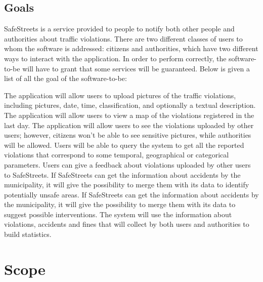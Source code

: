 \documentclass[../RASD.tex]{subfiles}
\begin{document}
    \subsection{Goals}\label{subsec:goals}
    SafeStreets is a service provided to people to notify both other people and authorities about traffic violations.
    There are two different classes of users to whom the software is addressed: citizens and authorities, which have two different ways to interact with the application.
    In order to perform correctly, the software-to-be will have to grant that some services will be guaranteed.
    Below is given a list of all the goal of the software-to-be:
    \begin{enumerate}
         The application will allow users to upload pictures of the traffic violations, including pictures, date, time, classification, and optionally a textual description.
         The application will allow users to view a map of the violations registered in the last day.
         The application will allow users to see the violations uploaded by other users;
        however, citizens won’t be able to see sensitive pictures, while authorities will be allowed.
         Users will be able to query the system to get all the reported violations that correspond to some temporal, geographical or categorical parameters.
         Users can give a feedback about violations uploaded by other users to SafeStreets.
         If SafeStreets can get the information about accidents by the municipality, it will give the possibility to merge them with its data to identify potentially unsafe areas.
        If SafeStreets can get the information about accidents by the municipality, it will give the possibility to merge them with its data to suggest possible interventions.
        The system will use the information about violations, accidents and fines that will collect by both users and authorities to build statistics.
    \end{enumerate}
    \newpage
    \section{Scope}\label{sec:scope}
\end{document}

